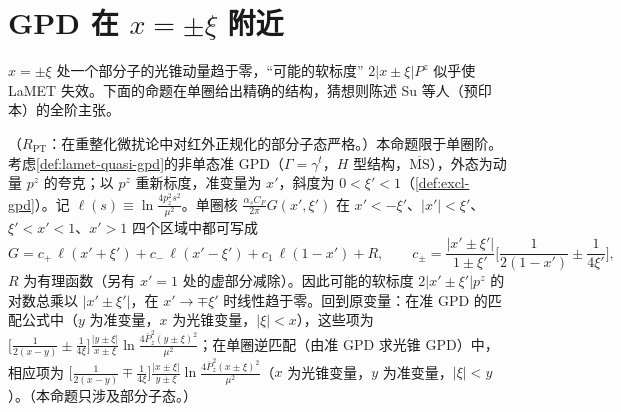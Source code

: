 \section{GPD 在 $x=\pm\xi$ 附近}\label{sec:yzliu-gpd}

$x=\pm\xi$ 处一个部分子的光锥动量趋于零，“可能的软标度” $2|x\pm\xi|P^z$ 似乎使 LaMET 失效。下面的命题在单圈给出精确的结构，猜想则陈述 Su 等人\cite{Su:2026eta}（预印本）的全阶主张。

\begin{proposition}[准 GPD 单圈匹配核在 $x=\pm\xi$ 附近的结构 \tagR]\label{prop:yzliu-gpd-oneloop}
（$R_{\mathrm{PT}}$：在重整化微扰论中对红外正规化的部分子态严格。）本命题限于单圈阶。考虑\cref{def:lamet-quasi-gpd}的非单态准 GPD（$\Gamma=\gamma^t$，$H$ 型结构，$\overline{\mathrm{MS}}$），外态为动量 $p^z$ 的夸克；以 $p^z$ 重新标度，准变量为 $x'$，斜度为 $0<\xi'<1$（\cref{def:excl-gpd}）。记 $\ell(s)\equiv\ln\frac{4p_z^2s^2}{\mu^2}$。单圈核 $\frac{\alpha_sC_F}{2\pi}G(x',\xi')$ 在 $x'<-\xi'$、$|x'|<\xi'$、$\xi'<x'<1$、$x'>1$ 四个区域中都可写成 %
\begin{equation}\label{eq:yzliu-gpd-decomp}
G=c_+\,\ell(x'+\xi')+c_-\,\ell(x'-\xi')+c_1\,\ell(1-x')+R,\qquad c_\pm=\frac{|x'\pm\xi'|}{1\pm\xi'}\Big[\frac1{2(1-x')}\pm\frac1{4\xi'}\Big],
\end{equation}
$R$ 为有理函数（另有 $x'=1$ 处的虚部分减除）。因此可能的软标度 $2|x'\pm\xi'|p^z$ 的对数总乘以 $|x'\pm\xi'|$，在 $x'\to\mp\xi'$ 时线性趋于零。回到原变量：在准 GPD 的匹配公式中（$y$ 为准变量，$x$ 为光锥变量，$|\xi|<x$），这些项为 $\big[\frac1{2(x-y)}\pm\frac1{4\xi}\big]\frac{|y\pm\xi|}{x\pm\xi}\ln\frac{4\bar P_z^2(y\pm\xi)^2}{\mu^2}$；在单圈逆匹配（由准 GPD 求光锥 GPD）中，相应项为 $\big[\frac1{2(x-y)}\mp\frac1{4\xi}\big]\frac{|x\pm\xi|}{y\pm\xi}\ln\frac{4\bar P_z^2(x\pm\xi)^2}{\mu^2}$（$x$ 为光锥变量，$y$ 为准变量，$|\xi|<y$）。（本命题只涉及部分子态。）
\end{proposition}

